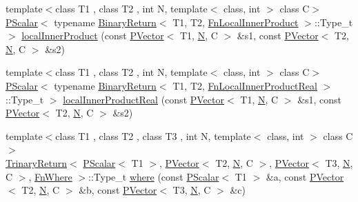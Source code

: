 \begin{DoxyCompactItemize}
\item 
{\footnotesize template$<$class T1 , class T2 , int N, template$<$ class, int $>$ class C$>$ }\\\mbox{\hyperlink{classENSEM_1_1PScalar}{P\+Scalar}}$<$ typename \mbox{\hyperlink{structENSEM_1_1BinaryReturn}{Binary\+Return}}$<$ T1, T2, \mbox{\hyperlink{structENSEM_1_1FnLocalInnerProduct}{Fn\+Local\+Inner\+Product}} $>$\+::Type\+\_\+t $>$ \mbox{\hyperlink{group__primvector_gabdc482461364fd471e22ddd6c0e1c2dd}{local\+Inner\+Product}} (const \mbox{\hyperlink{classENSEM_1_1PVector}{P\+Vector}}$<$ T1, \mbox{\hyperlink{operator__name__util_8cc_a7722c8ecbb62d99aee7ce68b1752f337}{N}}, C $>$ \&s1, const \mbox{\hyperlink{classENSEM_1_1PVector}{P\+Vector}}$<$ T2, \mbox{\hyperlink{operator__name__util_8cc_a7722c8ecbb62d99aee7ce68b1752f337}{N}}, C $>$ \&s2)
\item 
{\footnotesize template$<$class T1 , class T2 , int N, template$<$ class, int $>$ class C$>$ }\\\mbox{\hyperlink{classENSEM_1_1PScalar}{P\+Scalar}}$<$ typename \mbox{\hyperlink{structENSEM_1_1BinaryReturn}{Binary\+Return}}$<$ T1, T2, \mbox{\hyperlink{structENSEM_1_1FnLocalInnerProductReal}{Fn\+Local\+Inner\+Product\+Real}} $>$\+::Type\+\_\+t $>$ \mbox{\hyperlink{group__primvector_gad425d93792f21129cff7411c89c12d80}{local\+Inner\+Product\+Real}} (const \mbox{\hyperlink{classENSEM_1_1PVector}{P\+Vector}}$<$ T1, \mbox{\hyperlink{operator__name__util_8cc_a7722c8ecbb62d99aee7ce68b1752f337}{N}}, C $>$ \&s1, const \mbox{\hyperlink{classENSEM_1_1PVector}{P\+Vector}}$<$ T2, \mbox{\hyperlink{operator__name__util_8cc_a7722c8ecbb62d99aee7ce68b1752f337}{N}}, C $>$ \&s2)
\item 
{\footnotesize template$<$class T1 , class T2 , class T3 , int N, template$<$ class, int $>$ class C$>$ }\\\mbox{\hyperlink{structENSEM_1_1TrinaryReturn}{Trinary\+Return}}$<$ \mbox{\hyperlink{classENSEM_1_1PScalar}{P\+Scalar}}$<$ T1 $>$, \mbox{\hyperlink{classENSEM_1_1PVector}{P\+Vector}}$<$ T2, \mbox{\hyperlink{operator__name__util_8cc_a7722c8ecbb62d99aee7ce68b1752f337}{N}}, C $>$, \mbox{\hyperlink{classENSEM_1_1PVector}{P\+Vector}}$<$ T3, \mbox{\hyperlink{operator__name__util_8cc_a7722c8ecbb62d99aee7ce68b1752f337}{N}}, C $>$, \mbox{\hyperlink{structENSEM_1_1FnWhere}{Fn\+Where}} $>$\+::Type\+\_\+t \mbox{\hyperlink{group__primvector_ga17c089532ed62b8ac706539d3d0ecd14}{where}} (const \mbox{\hyperlink{classENSEM_1_1PScalar}{P\+Scalar}}$<$ T1 $>$ \&a, const \mbox{\hyperlink{classENSEM_1_1PVector}{P\+Vector}}$<$ T2, \mbox{\hyperlink{operator__name__util_8cc_a7722c8ecbb62d99aee7ce68b1752f337}{N}}, C $>$ \&b, const \mbox{\hyperlink{classENSEM_1_1PVector}{P\+Vector}}$<$ T3, \mbox{\hyperlink{operator__name__util_8cc_a7722c8ecbb62d99aee7ce68b1752f337}{N}}, C $>$ \&c)

\end{DoxyCompactItemize}
